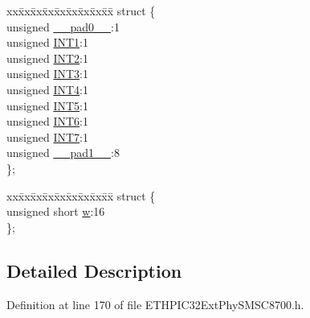 \begin{DoxyCompactItemize}
\begin{tabbing}
\end{tabbing}\item 
\begin{tabbing}
xx\=xx\=xx\=xx\=xx\=xx\=xx\=xx\=xx\=\kill
struct \{\\
\>unsigned \hyperlink{union_____i_n_t_s_o_u_r_c_ebits__t_adf71f3d8410c1f1dbbc96680a92c49af}{\_\_pad0\_\_}:1\\
\>unsigned \hyperlink{union_____i_n_t_s_o_u_r_c_ebits__t_a47cc5a5beb081340f905482dc80e00d3}{INT1}:1\\
\>unsigned \hyperlink{union_____i_n_t_s_o_u_r_c_ebits__t_a701a787be03bde234890290d2a507f1d}{INT2}:1\\
\>unsigned \hyperlink{union_____i_n_t_s_o_u_r_c_ebits__t_a6c886eb45c0096c0d3bc37b05416b171}{INT3}:1\\
\>unsigned \hyperlink{union_____i_n_t_s_o_u_r_c_ebits__t_af8c7aac64c1dded6d4bab1e8d958bc19}{INT4}:1\\
\>unsigned \hyperlink{union_____i_n_t_s_o_u_r_c_ebits__t_a832ae44f354c9afd727f5ace181e439f}{INT5}:1\\
\>unsigned \hyperlink{union_____i_n_t_s_o_u_r_c_ebits__t_a32ed04340c8ad7c9e9615760fe9c56e9}{INT6}:1\\
\>unsigned \hyperlink{union_____i_n_t_s_o_u_r_c_ebits__t_ace3cce0f8bc2d246805ad9a8c00ea02e}{INT7}:1\\
\>unsigned \hyperlink{union_____i_n_t_s_o_u_r_c_ebits__t_acaf2d0924a107ec6e8d2e31febaf66f9}{\_\_pad1\_\_}:8\\
\}; \\

\end{tabbing}\item 
\begin{tabbing}
xx\=xx\=xx\=xx\=xx\=xx\=xx\=xx\=xx\=\kill
struct \{\\
\>unsigned short \hyperlink{union_____i_n_t_s_o_u_r_c_ebits__t_a160850a4684a3e82c2323033964f2e98}{w}:16\\
\}; \\

\end{tabbing}\end{DoxyCompactItemize}


\subsection{Detailed Description}


Definition at line 170 of file E\+T\+H\+P\+I\+C32\+Ext\+Phy\+S\+M\+S\+C8700.\+h.



